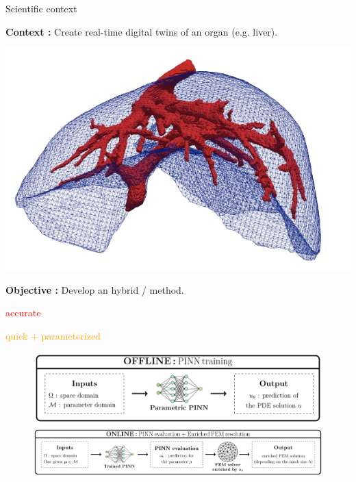 \begin{frame}{Scientific context}
	\begin{minipage}{0.75\linewidth}
		\textbf{Context :} Create real-time digital twins of an organ (e.g. liver).
	\end{minipage}
	\begin{minipage}{0.21\linewidth}
		\vspace{-20pt}
		\includegraphics[width=\linewidth]{images/intro/liver.png}
	\end{minipage}
	
	\vspace{5pt}
	\textbf{Objective :} Develop an hybrid  /  method.
	
	\vspace{1pt}
	\small
	\hspace{130pt} \begin{minipage}{0.14\linewidth}
		\textcolor{red}{accurate}
	\end{minipage} \hspace{8pt} \begin{minipage}{0.3\linewidth}
		\textcolor{orange}{quick + parameterized}
	\end{minipage}

	\begin{figure}[!ht]
		\centering
		\includegraphics[width=0.7\linewidth]{images/intro/pipeline/offline.pdf}

		\includegraphics[width=\linewidth]{images/intro/pipeline/online.pdf}
	\end{figure}
\end{frame}

